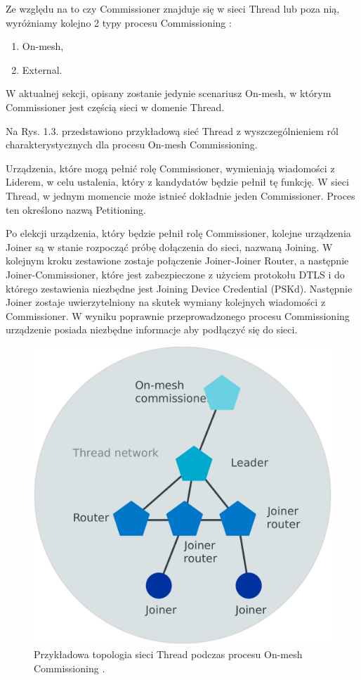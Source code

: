     Ze względu na to czy Commissioner znajduje się w sieci Thread lub poza nią, wyróżniamy kolejno 2 typy procesu Commissioning \cite{thread-commissioning}:
    \begin{enumerate}
        \item On-mesh,
        \item External.
    \end{enumerate}

    W aktualnej sekcji, opisany zostanie jedynie scenariusz On-mesh, w którym Commissioner jest częścią sieci w domenie Thread.

    Na Rys. 1.3. przedstawiono przykładową sieć Thread z wyszczególnieniem ról charakterystycznych dla procesu On-mesh Commissioning.

    Urządzenia, które mogą pełnić rolę Commissioner, wymieniają wiadomości z Liderem, w celu ustalenia, który z kandydatów będzie pełnił tę funkcję. W sieci Thread, w jednym momencie może istnieć dokładnie jeden Commissioner. Proces ten określono nazwą Petitioning.

    Po elekcji urządzenia, który będzie pełnił rolę Commissioner, kolejne urządzenia Joiner są w stanie rozpocząć próbę dołączenia do sieci, nazwaną Joining.
    W kolejnym kroku zestawione zostaje połączenie Joiner-Joiner Router, a następnie Joiner-Commissioner, które jest zabezpieczone z użyciem protokołu DTLS i do którego zestawienia niezbędne jest Joining Device Credential (PSKd). Następnie Joiner zostaje uwierzytelniony na skutek wymiany kolejnych wiadomości z Commissioner. W wyniku poprawnie przeprowadzonego procesu Commissioning urządzenie posiada niezbędne informacje aby podłączyć się do sieci.

    \begin{figure}[H]
        \centering
        \includegraphics[width=0.8\linewidth]{graphics/Thread_on-mesh_commissioning.jpg}
        \caption{Przykładowa topologia sieci Thread podczas procesu On-mesh Commissioning \cite{thread-commissioning}.}
        \label{fig:thread-on-mesh-commissioning}
    \end{figure}

